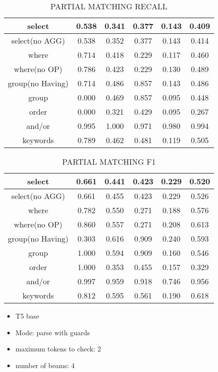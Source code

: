 \begin{table}[h!]
    \centering
    \begin{tabular}{|c|c|c|c|c|c|}
        \hline
        select           & 0.538 & 0.341 & 0.377 & 0.143 & 0.409 \\ \hline
        select(no AGG)   & 0.538 & 0.352 & 0.377 & 0.143 & 0.414 \\ \hline
        where            & 0.714 & 0.418 & 0.229 & 0.117 & 0.460 \\ \hline
        where(no OP)     & 0.786 & 0.423 & 0.229 & 0.130 & 0.489 \\ \hline
        group(no Having) & 0.714 & 0.486 & 0.857 & 0.143 & 0.486 \\ \hline
        group            & 0.000 & 0.469 & 0.857 & 0.095 & 0.448 \\ \hline
        order            & 0.000 & 0.321 & 0.429 & 0.095 & 0.267 \\ \hline
        and/or           & 0.995 & 1.000 & 0.971 & 0.980 & 0.994 \\ \hline

        keywords         & 0.789 & 0.462 & 0.481 & 0.119 & 0.505 \\ \hline
    \end{tabular}
    \caption{PARTIAL MATCHING RECALL }

\end{table}

\begin{table}[h!]
    \centering
    \begin{tabular}{|c|c|c|c|c|c|}
        \hline
        select           & 0.661 & 0.441 & 0.423 & 0.229 & 0.520 \\ \hline
        select(no AGG)   & 0.661 & 0.455 & 0.423 & 0.229 & 0.526 \\ \hline
        where            & 0.782 & 0.550 & 0.271 & 0.188 & 0.576 \\ \hline
        where(no OP)     & 0.860 & 0.557 & 0.271 & 0.208 & 0.613 \\ \hline
        group(no Having) & 0.303 & 0.616 & 0.909 & 0.240 & 0.593 \\ \hline
        group            & 1.000 & 0.594 & 0.909 & 0.160 & 0.546 \\ \hline
        order            & 1.000 & 0.353 & 0.455 & 0.157 & 0.329 \\ \hline
        and/or           & 0.997 & 0.959 & 0.918 & 0.746 & 0.956 \\ \hline

        keywords         & 0.812 & 0.595 & 0.561 & 0.190 & 0.618 \\ \hline
    \end{tabular}
    \caption{PARTIAL MATCHING F1 }

\end{table}
\pagebreak
\begin{itemize}
    \item T5 base
    \item Mode: parse with guards
    \item maximum tokens to check: 2
    \item number of beams: 4
\end{itemize}

